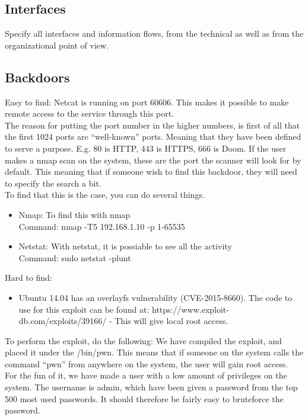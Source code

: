 \documentclass{article}
\begin{document}
\subsection{Interfaces}

Specify  all interfaces and  information flows, from the technical as well as from the
  organizational point of view.

\subsection{Backdoors}
Easy to find: 
Netcat is running on port 60606. This makes it possible to make remote access to the service through this port.\\

The reason for putting the port number in the higher numbers, is first of all that the first 1024 ports are “well-known” ports.  Meaning that they have been defined to serve a purpose. E.g. 80 is HTTP, 443 is HTTPS, 666 is Doom. If the user makes a nmap scan on the system, these are the port the scanner will look for by default. This meaning that if someone wish to find this backdoor, they will need to specify the search a bit.\\

To find that this is the case, you can do several things.
\begin{itemize}
\item Nmap: To find this with nmap\\
Command: nmap -T5 192.168.1.10 -p 1-65535
\item	Netstat: With netstat, it is possiable to see all the activity\\
Command: sudo netstat -plunt
\end{itemize}

Hard to find: 
\begin{itemize}
\item Ubuntu 14.04 has an overlayfs vulnerability (CVE-2015-8660). The code to use for this exploit can be found at: https://www.exploit-db.com/exploits/39166/ - This will give local root access.
\end{itemize}

To perform the exploit, do the following:
We have compiled the exploit, and placed it under the /bin/pwn. This means that if someone on the system calls the command “pwn” from anywhere on the system, the user will gain root access. \\

For the fun of it, we have made a user with a low amount of privileges on the system. The username is admin, which have been given a password from the top 500 most used passwords. It should therefore be fairly easy to bruteforce the password. \\
\end{document}
